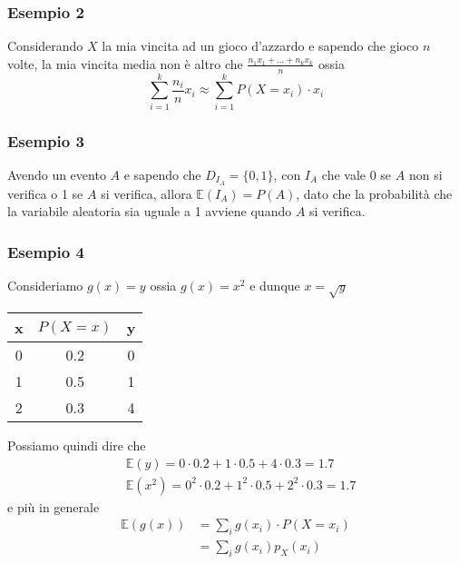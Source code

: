 \documentclass[11pt]{report}
\begin{document}
\subsubsection{Esempio 2}
Considerando $X$ la mia vincita ad un gioco d'azzardo e sapendo che gioco $n$ volte, la mia vincita media non è altro che $\frac{n_1x_1 + ... + n_kx_k}{n}$ ossia
\begin{equation}
    \sum_{i=1}^{k}\frac{n_i}{n}x_i \approx \sum_{i=1}^{k}P(X=x_i) \cdot x_i
\end{equation}
\subsubsection{Esempio 3}
Avendo un evento $A$ e sapendo che $D_{I_A} = \{0,1\}$, con $I_A$ che vale 0 se $A$ non si verifica o 1 se $A$ si verifica, allora $\mathbb{E}(I_A) = P(A)$, dato che la probabilità che la variabile aleatoria sia uguale a 1 avviene quando $A$ si verifica.
\subsubsection{Esempio 4}
Consideriamo $g(x) = y$ ossia $g(x) = x^2$ e dunque $x = \sqrt{y}$
\begin{center}
\begin{tabular}{ c | c | c }
x & $P(X=x)$ & y \\
\hline
0 & 0.2 & 0 \\
1 & 0.5 & 1 \\
2 & 0.3 & 4 \\
\end{tabular}
\end{center}
Possiamo quindi dire che
\begin{equation}
    \begin{split}
        & \mathbb{E}(y) = 0 \cdot 0.2 + 1 \cdot 0.5 + 4 \cdot 0.3 = 1.7\\
        & \mathbb{E}(x^2) = 0^2 \cdot 0.2 + 1^2 \cdot 0.5 + 2^2 \cdot 0.3 = 1.7
    \end{split}
\end{equation}
e più in generale
\begin{equation}
    \begin{split}
        \mathbb{E}(g(x)) & = \sum_{i}g(x_i) \cdot P(X=x_i)\\
        & = \sum_{i}g(x_i)p_X(x_i)
    \end{split}
\end{equation}
\end{document}
